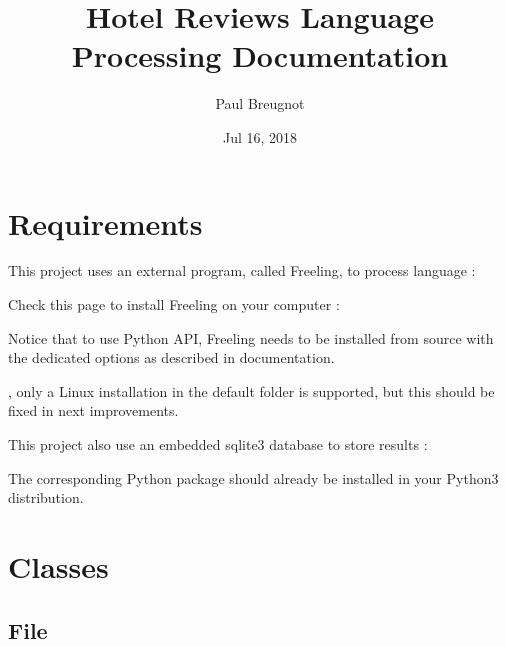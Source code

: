 \documentclass[letterpaper,10pt,english]{sphinxmanual}
\title{Hotel Reviews Language Processing Documentation}
\date{Jul 16, 2018}
\author{Paul Breugnot}
\begin{document}
\maketitle
\sphinxtableofcontents
{}\label{\detokenize{index::doc}}



\chapter{Requirements}
\label{\detokenize{index:requirements}}
\begin{DUlineblock}{0em}
\item[] This project uses an external program, called Freeling, to process language : 
\item[] Check this page to install Freeling on your computer : 
\item[] Notice that to use Python API, Freeling needs to be installed from source with the dedicated options as described in documentation.
\item[] , only a Linux installation in the default folder  is supported, but this should be fixed in next improvements.
\end{DUlineblock}

\begin{DUlineblock}{0em}
\item[] This project also use an embedded sqlite3 database to store results : 
\item[] The corresponding Python package should already be installed in your Python3 distribution.
\end{DUlineblock}


\chapter{Classes}
\label{\detokenize{index:classes}}

\section{File}
\label{\detokenize{index:file}}
\end{document}
